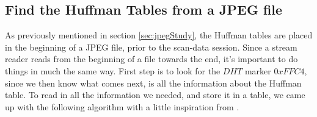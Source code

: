 \subsection{Find the Huffman Tables from a JPEG file}
As previously mentioned in section \ref{sec:jpegStudy}, the Huffman tables are placed in the beginning of a JPEG file, prior to the scan-data session. 
Since a stream reader reads from the beginning of a file towards the end, it's important to do things in much the same way. 
First step is to look for the $DHT$ marker $0xFFC4$, since we then know what comes next, is all the information about the Huffman table. 
To read in all the information we needed, and store it in a table, we came up with the following algorithm with a little inspiration from \cite{HuffmanDecoding}.

